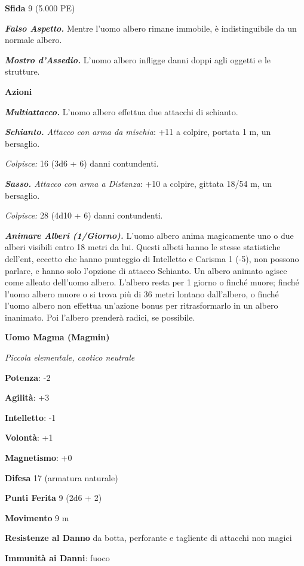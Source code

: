\begin{multicols}{2}
\textbf{Sfida} 9 (5.000 PE)\smallskip

\emph{\textbf{Falso Aspetto.}} Mentre l'uomo albero rimane immobile, è
indistinguibile da un normale albero.

\emph{\textbf{Mostro d'Assedio.}} L'uomo albero infligge danni doppi
agli oggetti e le strutture.

\smallskip\textbf{Azioni}

\emph{\textbf{Multiattacco.}} L'uomo albero effettua due attacchi di
schianto.

\emph{\textbf{Schianto.} Attacco con arma da mischia}: +11 a colpire,
portata 1 m, un bersaglio.

\emph{Colpisce:} 16 (3d6 + 6) danni contundenti.

\emph{\textbf{Sasso.} Attacco con arma a Distanza}: +10 a colpire,
gittata 18/54 m, un bersaglio.

\emph{Colpisce:} 28 (4d10 + 6) danni contundenti.

\emph{\textbf{Animare Alberi (1/Giorno).}} L'uomo albero anima
magicamente uno o due alberi visibili entro 18 metri da lui. Questi
albeti hanno le stesse statistiche dell'ent, eccetto che hanno punteggio
di Intelletto e Carisma 1 (-5), non possono parlare, e hanno solo
l'opzione di attacco Schianto. Un albero animato agisce come alleato
dell'uomo albero. L'albero resta per 1 giorno o finché muore; finché
l'uomo albero muore o si trova più di 36 metri lontano dall'albero, o
finché l'uomo albero non effettua un'azione bonus per ritrasformarlo in
un albero inanimato. Poi l'albero prenderà radici, se possibile.



\textbf{Uomo Magma (Magmin)}

\emph{Piccola elementale, caotico neutrale}

\textbf{Potenza}: -2

\textbf{Agilità}: +3

\textbf{Intelletto}: -1

\textbf{Volontà}: +1

\textbf{Magnetismo}: +0

\textbf{Difesa} 17 (armatura naturale)

\textbf{Punti Ferita} 9 (2d6 + 2)

\textbf{Movimento} 9 m

\textbf{Resistenze al Danno} da botta, perforante e tagliente di
attacchi non magici

\textbf{Immunità ai Danni}: fuoco


\end{multicols}
